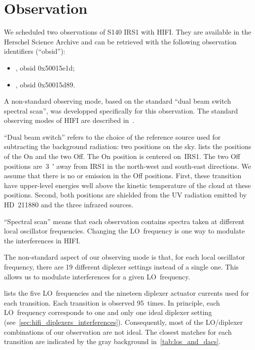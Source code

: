 \FloatBarrier
\section{Observation}

We scheduled two observations of S140 IRS1 with HIFI.
They are available in the Herschel Science Archive and can be retrieved with the following observation identifiers (``obsid''):
\begin{itemize}[noitemsep,nolistsep]
    \item {}, obsid 0x50015e1d;
    \item {}, obsid 0x50015d89.
\end{itemize}

A non-standard observing mode, based on the standard ``dual beam switch spectral scan'', was developped specifically for this observation.
The standard observing modes of HIFI are described in~\textcite{hifiobserversmanual}.

``Dual beam switch'' refers to the choice of the reference source used for subtracting the background radiation: two positions on the sky.
 lists the positions of the On and the two Off.
The On position is centered on~IRS1.
The two Off positions are~\SI{3}{\arcmin} away from IRS1 in the north-west and south-east directions.
We assume that there is no  or  emission in the Off positions.
First, these transition have upper-level energies well above the kinetic temperature of the cloud at these positions.
Second, both positions are shielded from the UV radiation emitted by HD~211880 and the three infrared sources.

``Spectral scan'' means that each observation contains spectra taken at different local oscillator frequencies.
Changing the LO~frequency is one way to modulate the interferences in HIFI.

The non-standard aspect of our observing mode is that, for each local oscillator frequency, there are 19 different diplexer settings instead of a single one.
This allows us to modulate interferences for a given LO~frequency.

 lists the five LO~frequencies and the nineteen diplexer actuator currents used for each transition.
Each transition is observed 95~times.
In principle, each LO~frequency corresponds to one and only one ideal diplexer setting
(see~\cref{sec:hifi_diplexers_interferences}).
Consequently, most of the LO/diplexer combinations of our observation are not ideal.
The closest matches for each  transition are indicated by the gray background in~\cref{tab:los_and_dacs}.

